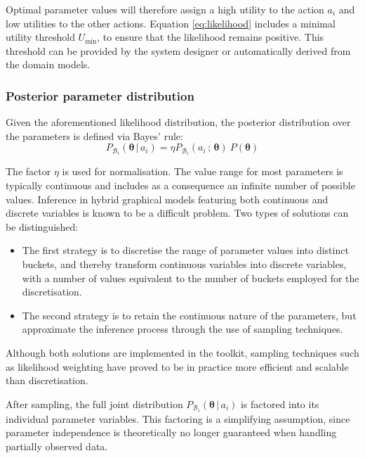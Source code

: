 Optimal parameter values will therefore assign a high utility to the action $a_i$ and low utilities to the other actions. Equation \eqref{eq:likelihood} includes a minimal utility threshold $U_{\mathrm{min}}$, to ensure that the likelihood remains positive. This threshold can be provided by the system designer or automatically derived from the domain models. 

\subsubsection*{Posterior parameter distribution}

Given the aforementioned likelihood distribution, the posterior distribution over the parameters is defined via Bayes' rule: 
\begin{equation}
P_{\mathcal{B}_i}(\boldsymbol\theta \, | \, a_i) = \eta P_{\mathcal{B}_i}(a_i \, ; \, \boldsymbol\theta) \ P(\boldsymbol\theta )
\end{equation}

The factor $\eta$ is used for normalisation. The value range for most parameters is typically continuous and includes as a consequence an infinite number of possible values. Inference in hybrid graphical models featuring both continuous and discrete variables is known to be a difficult problem.  Two types of solutions can be distinguished:
\begin{itemize}
\item The first strategy is to discretise the range of parameter values into distinct buckets, and thereby transform continuous variables into discrete variables, with a number of values equivalent to the number of buckets employed for the discretisation.
\item The second strategy is to retain the continuous nature of the parameters, but approximate the inference process through the use of sampling techniques.  
\end{itemize}

Although both solutions are implemented in the \opendial toolkit, sampling techniques such as likelihood weighting have proved to be in practice more efficient and scalable than discretisation. 

After sampling, the full joint distribution $P_{\mathcal{B}_i}(\boldsymbol\theta \, | \, a_i)$ is factored into its individual parameter variables. This factoring is a simplifying assumption, since parameter independence is theoretically no longer guaranteed when handling partially observed data. 

